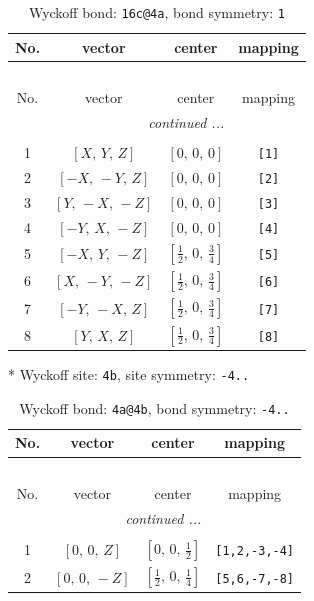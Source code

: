 \documentclass[fleqn,8pt]{jsarticle}
\begin{document}
\renewcommand{\arraystretch}{1.2}
\begin{longtable}{cccc}
\caption{Wyckoff bond: {\tt 16c@4a}, bond symmetry: {\tt 1}}
 \\
 \hline \hline
No. & vector & center & mapping \\ \hline \endfirsthead

\multicolumn{3}{l}{\tablename\ \thetable{}} \\
 \hline \hline
No. & vector & center & mapping \\ \hline \endhead

 \hline \hline
\multicolumn{3}{r}{\footnotesize\it continued ...} \\ \endfoot

 \hline \hline
\multicolumn{3}{r}{} \\ \endlastfoot

1 & $\left[ X,\, Y,\, Z \right]$ & $\left[ 0,\, 0,\, 0 \right]$ & {\tt [1]} \\ \hline
2 & $\left[ - X,\, - Y,\, Z \right]$ & $\left[ 0,\, 0,\, 0 \right]$ & {\tt [2]} \\ \hline
3 & $\left[ Y,\, - X,\, - Z \right]$ & $\left[ 0,\, 0,\, 0 \right]$ & {\tt [3]} \\ \hline
4 & $\left[ - Y,\, X,\, - Z \right]$ & $\left[ 0,\, 0,\, 0 \right]$ & {\tt [4]} \\ \hline
5 & $\left[ - X,\, Y,\, - Z \right]$ & $\left[ \frac{1}{2},\, 0,\, \frac{3}{4} \right]$ & {\tt [5]} \\ \hline
6 & $\left[ X,\, - Y,\, - Z \right]$ & $\left[ \frac{1}{2},\, 0,\, \frac{3}{4} \right]$ & {\tt [6]} \\ \hline
7 & $\left[ - Y,\, - X,\, Z \right]$ & $\left[ \frac{1}{2},\, 0,\, \frac{3}{4} \right]$ & {\tt [7]} \\ \hline
8 & $\left[ Y,\, X,\, Z \right]$ & $\left[ \frac{1}{2},\, 0,\, \frac{3}{4} \right]$ & {\tt [8]} \\
\end{longtable}
* Wyckoff site: {\tt 4b}, site symmetry: {\tt -4..}
\renewcommand{\arraystretch}{1.2}
\begin{longtable}{cccc}
\caption{Wyckoff bond: {\tt 4a@4b}, bond symmetry: {\tt -4..}}
 \\
 \hline \hline
No. & vector & center & mapping \\ \hline \endfirsthead

\multicolumn{3}{l}{\tablename\ \thetable{}} \\
 \hline \hline
No. & vector & center & mapping \\ \hline \endhead

 \hline \hline
\multicolumn{3}{r}{\footnotesize\it continued ...} \\ \endfoot

 \hline \hline
\multicolumn{3}{r}{} \\ \endlastfoot

1 & $\left[ 0,\, 0,\, Z \right]$ & $\left[ 0,\, 0,\, \frac{1}{2} \right]$ & {\tt [1,2,-3,-4]} \\ \hline
2 & $\left[ 0,\, 0,\, - Z \right]$ & $\left[ \frac{1}{2},\, 0,\, \frac{1}{4} \right]$ & {\tt [5,6,-7,-8]} \\
\end{longtable}
\end{document}
